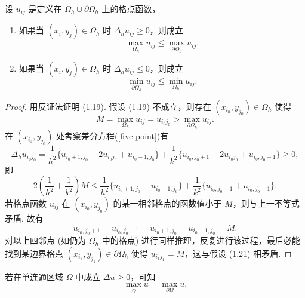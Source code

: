 \begin{lemma}[离散极值原理]
    设 $u_{ij}$ 是定义在 $\Omega_h \cup \partial\Omega_h$ 上的格点函数，
    \begin{enumerate}[label=(\arabic*)]
        \item 如果当 $(x_i, y_j) \in \Omega_h$ 时 $\Delta_h u_{ij} \geq 0$，则成立
        \begin{equation}
            \max_{\Omega_h} u_{ij} \leq \max_{\partial\Omega_h} u_{ij}. 
        \end{equation}
        \item 如果当 $(x_i, y_j) \in \Omega_h$ 时 $\Delta_h u_{ij} \leq 0$，则成立
        \begin{equation}
            \min_{\partial\Omega_h} u_{ij} \leq \min_{\Omega_h} u_{ij}. 
        \end{equation}
    \end{enumerate}
\end{lemma}
\begin{proof}
    用反证法证明 (1.19). 假设 (1.19) 不成立，则存在 $(x_{i_0}, y_{j_0}) \in \Omega_h$ 使得
    \begin{equation}
        M = \max_{\Omega_h} u_{ij} = u_{i_0 j_0} > \max_{\partial\Omega_h} u_{ij}. 
    \end{equation}
    在 $(x_{i_0}, y_{j_0})$ 处考察差分方程(\ref{five-point})有
    \begin{equation*}
        \Delta_h u_{i_0 j_0} = \frac{1}{h^2} \{u_{i_0+1, j_0} - 2u_{i_0 j_0} + u_{i_0-1, j_0}\} + \frac{1}{k^2} \{u_{i_0, j_0+1} - 2u_{i_0 j_0} + u_{i_0, j_0-1}\} \geq 0,
    \end{equation*}
    即
    \begin{equation*}
        2\left(\frac{1}{h^2} + \frac{1}{k^2}\right) M \leq \frac{1}{h^2} \{u_{i_0+1, j_0} + u_{i_0-1, j_0}\} + \frac{1}{k^2} \{u_{i_0, j_0+1} + u_{i_0, j_0-1}\}.
    \end{equation*}
    若格点函数 $u_{ij}$ 在 $(x_{i_0}, y_{j_0})$ 的某一相邻格点的函数值小于 $M$，则与上一不等式矛盾. 故有
    \begin{equation*}
        u_{i_0, j_0+1} = u_{i_0, j_0-1} = u_{i_0+1, j_0} = u_{i_0-1, j_0} = M.
    \end{equation*}
    对以上四邻点 (如仍为 $\Omega_h$ 中的格点) 进行同样推理，反复进行该过程，最后必能找到某边界格点 $(x_{i_1}, y_{j_1}) \in \partial\Omega_h$ 使得 $u_{i_1 j_1} = M$，这与假设 (1.21) 相矛盾.
\end{proof}

\begin{lemma}[连续情形极值原理]
    若在单连通区域 $\Omega$ 中成立 $\Delta u \geq 0$，可知
    \begin{equation}
        \max_{\bar{\Omega}} u = \max_{\partial\Omega} u. 
    \end{equation}
\end{lemma}



